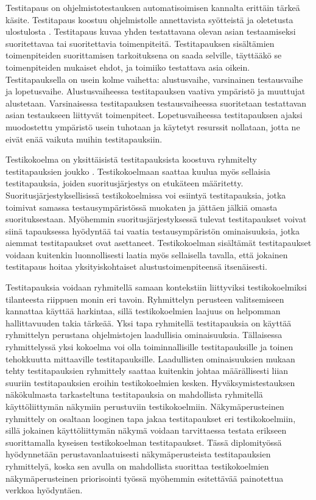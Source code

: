   Testitapaus on ohjelmistotestauksen automatisoimisen kannalta erittäin tärkeä käsite.
  Testitapaus koostuu ohjelmistolle annettavista syötteistä ja oletetusta ulostulosta \cite[s.~21]{software_testing_book}.
  Testitapaus kuvaa yhden testattavana olevan asian testaamiseksi suoritettavaa tai suoritettavia toimenpiteitä.
  Testitapauksen sisältämien toimenpiteiden suorittamisen tarkoituksena on saada selville, täyttääkö se toimenpiteiden mukaiset ehdot, ja toimiiko testattava asia oikein.
  Testitapauksella on usein kolme vaihetta: alustusvaihe, varsinainen testausvaihe ja lopetusvaihe.
  Alustusvaiheessa testitapauksen vaativa ympäristö ja muuttujat alustetaan.
  Varsinaisessa testitapauksen testausvaiheessa suoritetaan testattavan asian testaukseen liittyvät toimenpiteet.
  Lopetusvaiheessa testitapauksen ajaksi muodostettu ympäristö usein tuhotaan ja käytetyt resurssit nollataan, jotta ne eivät enää vaikuta muihin testitapauksiin.

  Testikokoelma on yksittäisistä testitapauksista koostuva ryhmitelty testitapauksien joukko \cite[s.~22]{software_testing_book}.
  Testikokoelmaan saattaa kuulua myös sellaisia testitapauksia, joiden suoritusjärjestys on etukäteen määritetty.
  Suoritusjärjestyksellisissä testikokoelmissa voi esiintyä testitapauksia, jotka toimivat samassa testausympäristössä muokaten ja jättäen jälkiä omasta suorituksestaan.
  Myöhemmin suoritusjärjestyksessä tulevat testitapaukset voivat siinä tapauksessa hyödyntää tai vaatia testausympäristön ominaisuuksia, jotka aiemmat testitapaukset ovat asettaneet.
  Testikokoelman sisältämät testitapaukset voidaan kuitenkin luonnollisesti laatia myös sellaisella tavalla, että jokainen testitapaus hoitaa yksityiskohtaiset alustustoimenpiteensä itsenäisesti.

  Testitapauksia voidaan ryhmitellä samaan kontekstiin liittyviksi testikokoelmiksi tilanteesta riippuen monin eri tavoin.
  Ryhmittelyn perusteen valitsemiseen kannattaa käyttää harkintaa, sillä testikokoelmien laajuus on helpomman hallittavuuden takia tärkeää.
  Yksi tapa ryhmitellä testitapauksia on käyttää ryhmittelyn perustana ohjelmistojen laadullisia ominaisuuksia.
  Tällaisessa ryhmittelyssä yksi kokoelma voi olla toiminnallisille testitapauksille ja toinen tehokkuutta mittaaville testitapauksille.
  Laadullisten ominaisuuksien mukaan tehty testitapauksien ryhmittely saattaa kuitenkin johtaa määrällisesti liian suuriin testitapauksien eroihin testikokoelmien kesken.
  Hyväksymistestauksen näkökulmasta tarkasteltuna testitapauksia on mahdollista ryhmitellä käyttöliittymän näkymiin perustuviin testikokoelmiin.
  Näkymäperusteinen ryhmittely on osaltaan looginen tapa jakaa testitapaukset eri testikokoelmiin, sillä jokainen käyttöliittymän näkymä voidaan tarvittaessa testata erikseen suorittamalla kyseisen testikokoelman testitapaukset.
  Tässä diplomityössä hyödynnetään perustavanlaatuisesti näkymäperusteista testitapauksien ryhmittelyä, koska sen avulla on mahdollista suorittaa testikokoelmien näkymäperusteinen priorisointi työssä myöhemmin esitettävää painotettua verkkoa hyödyntäen.

